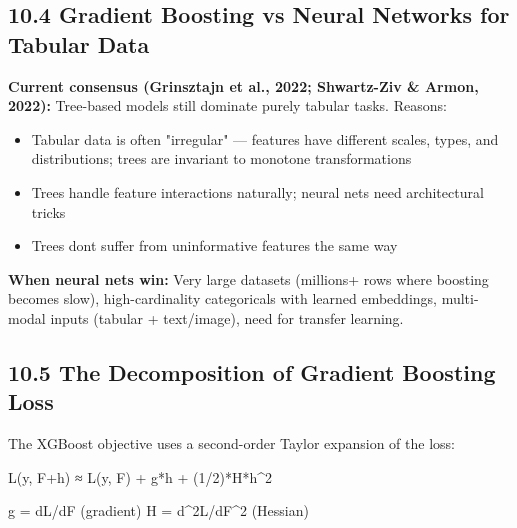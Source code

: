 \documentclass[11pt]{article}
\providecommand{\tightlist}{\setlength{\itemsep}{1pt}\setlength{\parskip}{0pt}}
\newenvironment{Shaded}{\begin{snugshade}}{\end{snugshade}}
\newcommand{\DecValTok}[1]{\textcolor[rgb]{0.96,0.45,0.00}{#1}}
\newcommand{\NormalTok}[1]{\textcolor[rgb]{0.81,0.81,0.76}{#1}}
\newcommand{\OperatorTok}[1]{\textcolor[rgb]{0.81,0.81,0.76}{#1}}
\begin{document}
\subsection{10.4 Gradient Boosting vs Neural Networks for Tabular Data}\label{104-gradient-boosting-vs-neural-networks-for-tabular-data}

\textbf{Current consensus (Grinsztajn et al., 2022; Shwartz-Ziv \& Armon, 2022):} Tree-based models still dominate purely tabular tasks. Reasons:

\begin{itemize}
\tightlist
\item
  Tabular data is often "irregular" --- features have different scales, types, and distributions; trees are invariant to monotone transformations
\item
  Trees handle feature interactions naturally; neural nets need architectural tricks
\item
  Trees don\textquotesingle t suffer from uninformative features the same way
\end{itemize}

\textbf{When neural nets win:} Very large datasets (millions+ rows where boosting becomes slow), high-cardinality categoricals with learned embeddings, multi-modal inputs (tabular + text/image), need for transfer learning.

\subsection{10.5 The Decomposition of Gradient Boosting Loss}\label{105-the-decomposition-of-gradient-boosting-loss}

The XGBoost objective uses a second-order Taylor expansion of the loss:


\begin{Shaded}
\begin{Highlighting}[]
\NormalTok{L(y, F}\OperatorTok{+}\NormalTok{h) ≈ L(y, F) }\OperatorTok{+}\NormalTok{ g}\OperatorTok{*}\NormalTok{h }\OperatorTok{+}\NormalTok{ (}\DecValTok{1}\OperatorTok{/}\DecValTok{2}\NormalTok{)}\OperatorTok{*}\NormalTok{H}\OperatorTok{*}\NormalTok{h}\OperatorTok{\^{}}\DecValTok{2}

\NormalTok{g }\OperatorTok{=}\NormalTok{ dL}\OperatorTok{/}\NormalTok{dF    (gradient)}
\NormalTok{H }\OperatorTok{=}\NormalTok{ d}\OperatorTok{\^{}}\DecValTok{2L}\OperatorTok{/}\NormalTok{dF}\OperatorTok{\^{}}\DecValTok{2}\NormalTok{   (Hessian)}
\end{Highlighting}
\end{Shaded}
\end{document}
